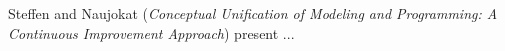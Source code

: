 

Steffen and Naujokat
\cite{isola-2016-steffen}
({\em Conceptual Unification of Modeling and Programming:
A Continuous Improvement Approach})
present ...

